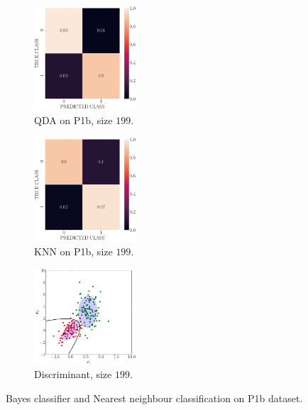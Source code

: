 \documentclass[11pt, a4 paper]{article}
\begin{document}
\begin{figure}[!htbp]
\quad    
    \begin{subfigure}[!htbp]{0.24\textwidth}
       \centering
       \includegraphics[width=1.5in]{../results/ex1/conf_mtx_QD_ML_dataset_P1b_size_199.pdf}
       \caption{QDA on P1b, size $199$.}
       \label{fig:KNN_P1b_199}
    \end{subfigure}
\quad    
    \begin{subfigure}[!htbp]{0.24\textwidth}
       \centering
       \includegraphics[width=1.5in]{../results/ex1/conf_mtx_KNN_dataset_P1b_size_199.pdf}
       \caption{KNN on P1b, size $199$.}
       \label{fig:KNN_P1b_199}
    \end{subfigure}
\quad
    \begin{subfigure}[!htbp]{0.24\textwidth}
       \centering
       \includegraphics[width=1.5in]{../results/ex1/samples_QD_ML_dataset_P1b_size_199.pdf}
       \caption{Discriminant, size $199$.}
       \label{fig:KNN_P1b_199}
    \end{subfigure}

\caption{Bayes classifier and Nearest neighbour classification on P1b dataset.}
\label{fig:ex11P1b}
\end{figure}
\end{document}

